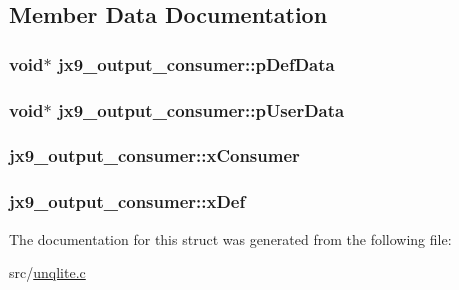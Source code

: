 \subsection{Member Data Documentation}
\hypertarget{structjx9__output__consumer_a36bd3aff6d78c0718d70e5def6ca31e9}{
\subsubsection[{p\-Def\-Data}]{\setlength{\rightskip}{0pt plus 5cm}void$\ast$ jx9\-\_\-output\-\_\-consumer\-::p\-Def\-Data}}\label{d4/db5/structjx9__output__consumer_a36bd3aff6d78c0718d70e5def6ca31e9}
\hypertarget{structjx9__output__consumer_a8370c979af9358b311d641763d47bce1}{
\subsubsection[{p\-User\-Data}]{\setlength{\rightskip}{0pt plus 5cm}void$\ast$ jx9\-\_\-output\-\_\-consumer\-::p\-User\-Data}}\label{d4/db5/structjx9__output__consumer_a8370c979af9358b311d641763d47bce1}
\hypertarget{structjx9__output__consumer_a6859bf5fccf2c1b8f4c93a81810a6f30}{
\subsubsection[{x\-Consumer}]{ jx9\-\_\-output\-\_\-consumer\-::x\-Consumer}}\label{d4/db5/structjx9__output__consumer_a6859bf5fccf2c1b8f4c93a81810a6f30}
\hypertarget{structjx9__output__consumer_a6a0ad0d53bcb945dfa1cf8da091c707e}{
\subsubsection[{x\-Def}]{ jx9\-\_\-output\-\_\-consumer\-::x\-Def}}\label{d4/db5/structjx9__output__consumer_a6a0ad0d53bcb945dfa1cf8da091c707e}


The documentation for this struct was generated from the following file\-:\begin{DoxyCompactItemize}
\item 
src/\hyperlink{unqlite_8c}{unqlite.\-c}\end{DoxyCompactItemize}
